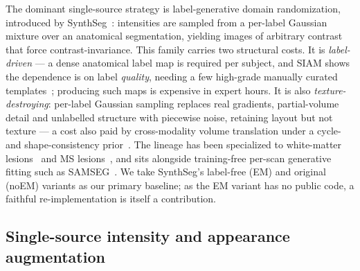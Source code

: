 The dominant single-source strategy is label-generative domain randomization,
introduced by SynthSeg~\cite{billot2023synthseg}: intensities are sampled from a
per-label Gaussian mixture over an anatomical segmentation, yielding images of
arbitrary contrast that force contrast-invariance. This family carries two
structural costs. It is \emph{label-driven} --- a dense anatomical label map is
required per subject, and SIAM shows the dependence is on label \emph{quality},
needing a few high-grade manually curated templates~\cite{valabregue2026siam};
producing such maps is expensive in expert hours. It is also
\emph{texture-destroying}: per-label Gaussian sampling replaces real gradients,
partial-volume detail and unlabelled structure with piecewise noise, retaining
layout but not texture --- a cost also paid by cross-modality volume
translation under a cycle- and shape-consistency prior~\cite{zhang2018cycleshapegan}. The lineage has been specialized to
white-matter lesions~\cite{laso2024wmhsynthseg} and MS
lesions~\cite{caselles2026timelesseg}, and sits alongside training-free
per-scan generative fitting such as SAMSEG~\cite{cerri2021samseg}. We take
SynthSeg's label-free (EM) and original (noEM) variants as our primary baseline;
as the EM variant has no public code, a faithful re-implementation is itself a
contribution.

\subsection{Single-source intensity and appearance augmentation}
\label{subsec:aug}

